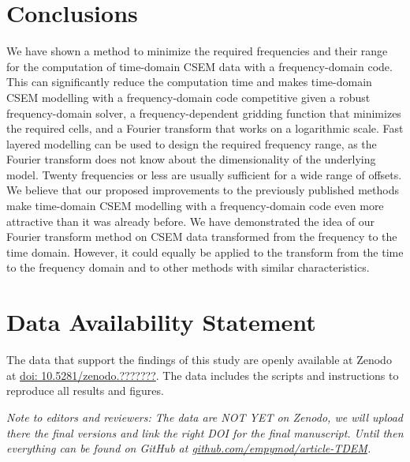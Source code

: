 \documentclass[onecolumn,extra,referee,camera]{gji}
\begin{document}
\section{Conclusions} %

We have shown a method to minimize the required frequencies and their range for
the computation of time-domain CSEM data with a frequency-domain code. This can
significantly reduce the computation time and makes time-domain CSEM modelling
with a frequency-domain code competitive given a robust frequency-domain
solver, a frequency-dependent gridding function that minimizes the required
cells, and a Fourier transform that works on a logarithmic scale. Fast layered
modelling can be used to design the required frequency range, as the Fourier
transform does not know about the dimensionality of the underlying model.
Twenty frequencies or less are usually sufficient for a wide range of offsets.
 We believe that our proposed improvements to the previously
published methods make time-domain CSEM modelling with a frequency-domain code
even more attractive than it was already before. We have demonstrated the idea
of our Fourier transform method on CSEM data transformed from the frequency to
the time domain. However, it could equally be applied to the transform from the
time to the frequency domain and to other methods with similar
characteristics.


\section{Data Availability Statement} %

The data that support the findings of this study are openly available at Zenodo
at \href{https://zenodo.org/badge/DOI/10.5281/zenodo.???????}{doi:
10.5281/zenodo.???????}. The data includes the scripts and instructions to
reproduce all results and figures.

\emph{Note to editors and reviewers: The data are NOT YET on Zenodo, we will
  upload there the final versions and link the right DOI for the final
  manuscript. Until then everything can be found on GitHub at
  \href{https://github.com/empymod/article-TDEM}%
  {github.com/empymod/article-TDEM}.}
\end{document}
